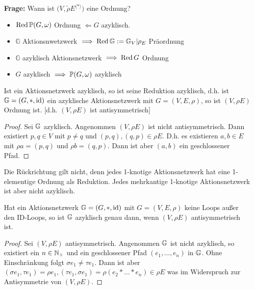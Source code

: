 \textbf{Frage:} Wann ist $\big(V,\tilde{\rho}E^{\langle\ast\rangle}\big)$ eine Ordnung?
\begin{itemize}
	\item $\Red \P(G,\omega)$ Ordnung $\Longleftarrow G$ azyklisch.
	\item $\mathbb{G}$ Aktionsnwetzwerk $\implies \Red\G := \G_V|\rho_E$ Präordnung
	\item $\mathbb{G}$ azyklisch Aktionsnetzwerk $\implies\Red G$ Ordnung
	\item $G$ azyklisch $\implies\P(G,\omega)$ azyklisch
\end{itemize}

\begin{proposition}
    Ist ein Aktionsnetzwerk azyklisch, so ist seine Reduktion azyklisch, d.h.
    ist $\G =(G, \ast, \id)$ ein azyklische Aktionsnetzwerk mit $G =(V,E,\rho)$, so ist $(V, \rho E)$ Ordnung ist. [d.h. $(V,\rho E)$ ist antisymmetrisch]
\end{proposition}
\begin{proof}
    Sei $\G$ azyklisch. Angenommen $(V, \rho E)$ ist nicht antisymmetrisch. Dann existiert $p,q \in V$ mit $p\ne q$ und $(p,q),(q,p) \in \rho E$.
    D.h. es existieren $a,b \in E$ mit $\rho a =(p,q)$ und $\rho b = (q,p)$. Dann ist aber $(a,b)$ ein geschlossener Pfad.
\end{proof}

\begin{bemerkungnr}
    Die Rückrichtung gilt nicht, denn jedes 1-knotige Aktionsnetzwerk hat eine 1-elementige Ordnung als Reduktion. Jedes mehrkantige
    1-knotige Aktionsnetzwerk ist aber nicht azyklisch.
\end{bemerkungnr}

\begin{bemerkungnr}
    Hat ein Aktionsnetzwerk $\G =(G, \ast, \id)$ mit $G=(V,E,\rho)$ keine Loops außer den ID-Loops, so ist $\G$ azyklisch genau dann, wenn 
    $(V, \rho E)$ antisymmetrisch ist.
\end{bemerkungnr}
\begin{proof}
    Sei $(V, \rho E)$ antisymmetrisch. Angenommen $\G$ ist nicht azyklisch, so existiert ein $n \in \N_+$ und ein geschlossener Pfad
    $(e_1, \ldots,e_n)$ in $\G$. Ohne Einschränkung folgt $\sigma e_1 \ne \tau e_1$. Dann ist aber $(\sigma e_1, \tau e_1)=\rho e_1,
    (\tau e_1, \sigma e_1)=\rho(e_2\ast\ldots\ast e_n) \in \rho E$ was im Widerspruch zur Antisymmetrie von $(V, \rho E)$.
\end{proof}

